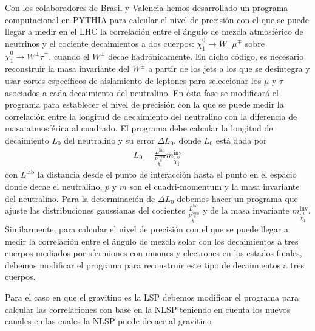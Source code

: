 \begin{itemize}
\begin{proyecto}
  Con los colaboradores de Brasil y Valencia hemos desarrollado un
  programa computacional en PYTHIA para calcular el nivel de precisión
  con el que se puede llegar a medir en el LHC la correlación entre el
  ángulo de mezcla atmosférico de neutrinos y el cociente decaimientos
  a dos cuerpos: $\tilde\chi_1^0\to W^\pm\mu^\mp$ sobre
  $\tilde\chi_1^0\to W^\pm\tau^\mp$, cuando el $W^\pm$ decae
  hadrónicamente. En dicho código, es necesario reconstruir la masa
  invariante del $W^\pm$ a partir de los jets a los que se desintegra
  y usar cortes específicos de aislamiento de leptones para seleccionar
  los $\mu$ y $\tau$ asociados a cada decaimiento del neutralino. En
  ésta fase se modificará el programa para establecer el nivel de
  precisión con la que se puede medir la correlación entre la longitud
  de decaimiento del neutralino con la diferencia de masa atmosférica
  al cuadrado.  El programa debe calcular la longitud de
  decaimiento $L_0$ del neutralino y su error $\Delta L_0$, donde
  $L_0$ está dada por
  \begin{align}
    L_0=\frac{L^{\text{lab}}}{p_{\tilde\chi_1^0}^{\text{reco}}}m_{\tilde\chi_1^0}^{\text{inv}}
  \end{align}
  con $L^{\text{lab}}$ la distancia desde el punto de interacción
  hasta el punto en el espacio donde decae el neutralino, $p$ y $m$
  son el cuadri-momentum y la masa invariante del neutralino. Para la
  determinación de $\Delta L_0$ debemos hacer un programa que ajuste
  las distribuciones gaussianas del cocientes
  $\frac{L^{\text{lab}}}{p_{\tilde\chi_1^0}^{\text{reco}}}$ y de la
  masa invariante $m_{\tilde\chi_1^0}^{\text{inv}}$. Similarmente, para
  calcular el nivel de precisión con el que se puede llegar a medir la
  correlación entre el ángulo de mezcla solar con los decaimientos a
  tres cuerpos mediados por sfermiones con muones y electrones en los
  estados finales, debemos modificar el programa para reconstruir este
  tipo de decaimientos a tres cuerpos.
\end{proyecto}

\begin{proyecto}
  Para el caso en que el gravitino es la LSP debemos modificar el
  programa para calcular las correlaciones con base en la NLSP
  teniendo en cuenta los nuevos canales en las cuales la NLSP puede
  decaer al gravitino
\end{proyecto}



\end{itemize}
